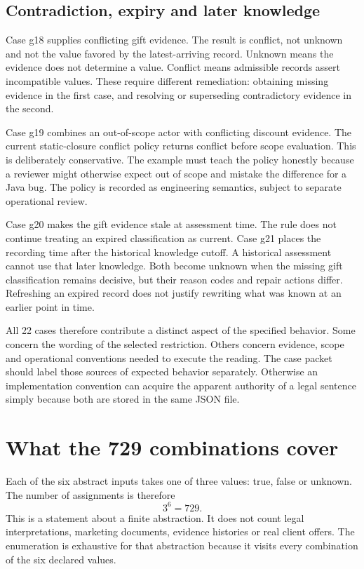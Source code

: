 \subsection{Contradiction, expiry and later knowledge}
Case g18 supplies conflicting gift evidence. The result is conflict, not
unknown and not the value favored by the latest-arriving record. Unknown means
the evidence does not determine a value. Conflict means admissible records
assert incompatible values. These require different remediation: obtaining
missing evidence in the first case, and resolving or superseding contradictory
evidence in the second.

Case g19 combines an out-of-scope actor with conflicting discount evidence.
The current static-closure conflict policy returns conflict before scope
evaluation. This is deliberately conservative. The example must teach the
policy honestly because a reviewer might otherwise expect out of scope and
mistake the difference for a Java bug. The policy is recorded as engineering
semantics, subject to separate operational review.

Case g20 makes the gift evidence stale at assessment time. The rule does not
continue treating an expired classification as current. Case g21 places the
recording time after the historical knowledge cutoff. A historical assessment
cannot use that later knowledge. Both become unknown when the missing gift
classification remains decisive, but their reason codes and repair actions
differ. Refreshing an expired record does not justify rewriting what was known
at an earlier point in time.

All 22 cases therefore contribute a distinct aspect of the specified behavior.
Some concern the wording of the selected restriction. Others concern evidence,
scope and operational conventions needed to execute the reading. The case
packet should label those sources of expected behavior separately. Otherwise
an implementation convention can acquire the apparent authority of a legal
sentence simply because both are stored in the same JSON file.

\section{What the 729 combinations cover}
\label{merge:M02:04}

\label{sec:circular-enumeration}
Each of the six abstract inputs takes one of three values: true, false or
unknown. The number of assignments is therefore
\begin{equation}
 3^6=729.
 \label{eq:case-domain-size}
\end{equation}
This is a statement about a finite abstraction. It does not count legal
interpretations, marketing documents, evidence histories or real client offers.
The enumeration is exhaustive for that abstraction because it visits every
combination of the six declared values.

